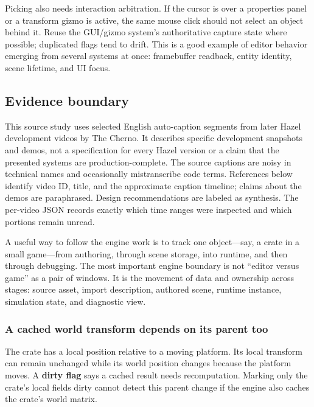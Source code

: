 Picking also needs interaction arbitration. If the cursor is over a properties panel or a transform gizmo is active, the same mouse click should not select an object behind it. Reuse the GUI/gizmo system's authoritative capture state where possible; duplicated flags tend to drift. This is a good example of editor behavior emerging from several systems at once: framebuffer readback, entity identity, scene lifetime, and UI focus.

\subsection{Evidence boundary}\label{06-engine-ii-ch032-evidence-boundary}

This source study uses selected English auto-caption segments from later Hazel development videos by The Cherno. It describes specific development snapshots and demos, not a specification for every Hazel version or a claim that the presented systems are production-complete. The source captions are noisy in technical names and occasionally mistranscribe code terms. References below identify video ID, title, and the approximate caption timeline; claims about the demos are paraphrased. Design recommendations are labeled as synthesis. The per-video JSON records exactly which time ranges were inspected and which portions remain unread.

A useful way to follow the engine work is to track one object---say, a crate in a small game---from authoring, through scene storage, into runtime, and then through debugging. The most important engine boundary is not ``editor versus game'' as a pair of windows. It is the movement of data and ownership across stages: source asset, import description, authored scene, runtime instance, simulation state, and diagnostic view.

\subsubsection{A cached world transform depends on its parent too}\label{06-engine-ii-ch032-a-cached-world-transform-depends-on-its-parent-too}

The crate has a local position relative to a moving platform. Its local transform can remain unchanged while its world position changes because the platform moves. A \textbf{dirty flag} says a cached result needs recomputation. Marking only the crate's local fields dirty cannot detect this parent change if the engine also caches the crate's world matrix.

